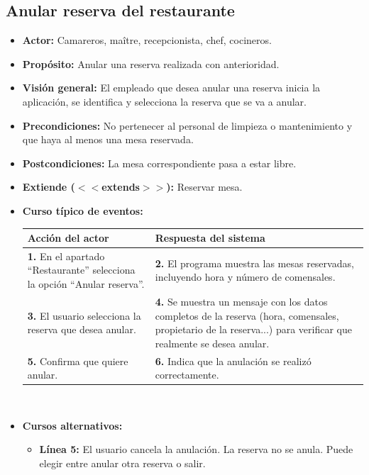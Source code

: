 \documentclass[spanish,a4paper,11pt, twoside]{report}	%
\begin{document}

		\subsection{Anular reserva del restaurante}
			\begin{itemize}
			\item \textbf{Actor:} Camareros, maître, recepcionista, chef, cocineros.
			\item \textbf{Propósito:} Anular una reserva realizada con anterioridad.
			\item \textbf{Visión general:} El empleado que desea anular una reserva inicia
							la aplicación, se identifica y selecciona la reserva que se va a anular.
			\item \textbf{Precondiciones:} No pertenecer al personal de limpieza o
							mantenimiento y que haya al menos una mesa reservada.
			\item \textbf{Postcondiciones:} La mesa correspondiente pasa a estar libre.
			\item \textbf{Extiende ($<<$extends$>>$):} Reservar mesa.
			\item \textbf{Curso típico de eventos:} 	\\
				\begin{tabular}{|p{6cm}||p{6cm}|}
				\hline
				\textbf{Acción del actor} & \textbf{Respuesta del sistema} \\ \hline \hline
				\textbf{1.} En el apartado ``Restaurante'' selecciona la opción ``Anular reserva''. & 
				\textbf{2.} El programa muestra las mesas reservadas, incluyendo hora y número de comensales. \\ \hline
				\textbf{3.} El usuario selecciona la reserva que desea anular.	& 
				\textbf{4.} Se muestra un mensaje con los datos completos de la reserva (hora,
					comensales, propietario de la reserva...) para verificar que realmente se desea
					anular. \\ \hline
				\textbf{5.} Confirma que quiere anular.	& 
				\textbf{6.} Indica que la anulación se realizó correctamente. \\ \hline
			\end{tabular}
			\\
			\item \textbf{Cursos alternativos:} 
			\begin{itemize}
				\item  \textbf{Línea 5:} El usuario cancela la anulación. La reserva no se anula.
										Puede elegir entre anular otra reserva o salir.
			\end {itemize}
		\end {itemize}
	
\end{document}
